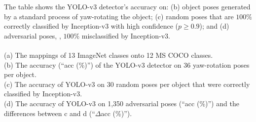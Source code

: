 \documentclass[10pt,twocolumn,letterpaper]{article}
\begin{document}
\begin{table*}
{		The table shows the YOLO-v3 detector's accuracy on: (b) object poses generated by a standard process of yaw-rotating the object; (c) random poses that are $100\%$ correctly classified by Inception-v3 with high confidence ($p \geq 0.9$); and (d) adversarial poses, \ie, $100\%$ misclassified by Inception-v3.\\\\
		(a) The mappings of 13 ImageNet classes onto 12 MS COCO classes.\\
		(b) The accuracy (``acc (\%)'') of the YOLO-v3 detector on 36 yaw-rotation poses per object.\\
		(c) The accuracy of YOLO-v3 on 30 random poses per object that were correctly classified by Inception-v3.\\
		(d) The accuracy of YOLO-v3 on 1,350 adversarial poses (``acc (\%)'') and the differences between c and d (``$\Delta$acc (\%)'').
	}
	\label{tab:yolo_transfer_stats}
\end{table*}

\clearpage

\end{document}
